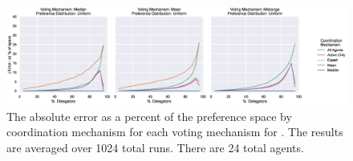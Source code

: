 \begin{landscape}
    \begin{figure}[p]
        \centering
        \includegraphics[scale=0.55]
        {content/chapter2/figures/distributions/Uniform_error_as_percent_of_space_abs_mean}
        \caption{
            The absolute error as a percent of the preference space by coordination
            mechanism for each voting mechanism for .
            The results are averaged over 1024 total runs.
            There are 24 total agents.
        }
        \label{fig:uniform-error-as-percent-of-space-abs-mean}
    \end{figure}
\end{landscape}
